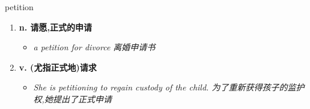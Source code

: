 
\begin{frame}
{\huge petition}
\begin{center}
\begin{enumerate}\Large
  \item \textbf{n. 请愿,正式的申请}
  \begin{itemize}
    \item \em{\Large{a petition for divorce 离婚申请书}}
  \end{itemize}
  \item \textbf{v. (尤指正式地)请求}
  \begin{itemize}
    \item \em{\Large{She is petitioning to regain custody of the child. 为了重新获得孩子的监护权,她提出了正式申请}}
  \end{itemize}
\end{enumerate}
\end{center}
\end{frame}
